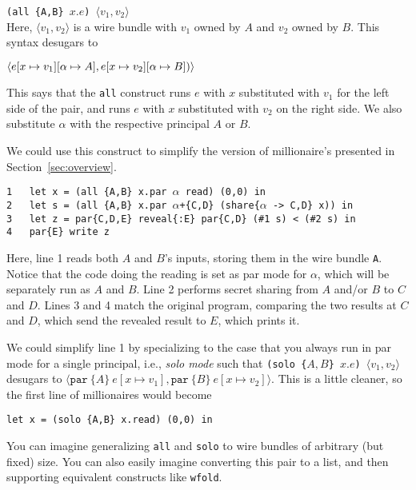 \documentclass[10pt]{article}
\newcommand{\kw}[1]{\ensuremath{\mathtt{#1}}}
\newcommand{\epar}[2]{\ensuremath{\kw{par}~{#1}~{#2}}}
\newcommand{\epair}[2]{\ensuremath{\langle {#1}, {#2} \rangle}}
\begin{document}
\bigskip
\noindent
\verb+(all {A,B} +$x.e$\verb+) +$\epair{v_1}{v_2}$\\

Here, $\epair{v_1}{v_2}$ is a wire bundle with $v_1$ owned by $A$ and $v_2$ owned by
$B$. This syntax desugars to

\bigskip
\noindent
$
\epair{e[x \mapsto v_1][\alpha \mapsto A]}{e[x \mapsto v_2][\alpha \mapsto B])}\\
$

This says that the \texttt{all} construct runs $e$ with $x$
substituted with $v_1$ for the left side of the pair, and runs $e$
with $x$ substituted with $v_2$ on the right side. We also substitute
$\alpha$ with the respective principal $A$ or $B$.

We could use this construct to simplify the version of millionaire's
presented in Section~\ref{sec:overview}.

\bigskip
\noindent
\verb+1   let x = (all {A,B} x.par +$\alpha$\verb+ read) (0,0) in+\\
\verb+2   let s = (all {A,B} x.par +$\alpha$\verb!+{C,D} (share{!$\alpha$\verb+ -> C,D} x)) in+\\
\verb+3   let z = par{C,D,E} reveal{:E} par{C,D} (#1 s) < (#2 s) in+\\
\verb+4   par{E} write z+

\bigskip
Here, line 1 reads both $A$ and $B$'s inputs, storing them in the wire
bundle \texttt{A}. Notice that the code doing the reading is set as
par mode for $\alpha$, which will be separately run as $A$ and
$B$. Line 2 performs secret sharing from $A$ and/or $B$ to $C$ and
$D$. Lines 3 and 4 match the original program, comparing the two
results at $C$ and $D$, which send the revealed result to $E$, which
prints it.

We could simplify line 1 by specializing to the case that you always
run in par mode for a single principal, i.e., \emph{solo mode} such
that 
\verb+(solo {+$A,B$\verb+} +$x.e$\verb+) +$\epair{v_1}{v_2}$
desugars to
$
\epair{\epar{\{A\}}{e}[x \mapsto v_1]}{\epar{\{B\}}{e[x \mapsto v_2]}}
$.
This is a little cleaner, so the first line of millionaires would become
\begin{verbatim}
let x = (solo {A,B} x.read) (0,0) in
\end{verbatim}
You can imagine generalizing \texttt{all} and \texttt{solo} to wire
bundles of arbitrary (but fixed) size. You can also easily imagine
converting this pair to a list, and then supporting equivalent
constructs like \texttt{wfold}.
\end{document}
